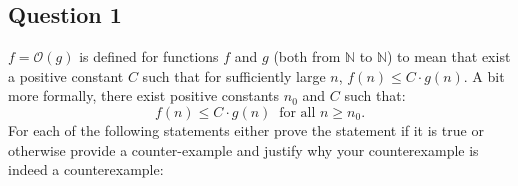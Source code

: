 \def\lc{\left\lceil}   
\def\rc{\right\rceil}
\runningheadrule
\firstpageheadrule
\cfoot{}
\subsection*{Question 1}
$f=\mathcal{O}(g)$ is defined for functions $f$ and $g$ (both from $\mathbb{N}$ to $\mathbb{N}$) to mean that exist a positive constant $C$ such that for sufficiently large $n$, $f(n)\leq C\cdot g(n)$. A bit more formally, there exist positive constants $n_0$ and $C$ such that:
$$f(n)\leq C\cdot g(n) \ \text{ for all } n\geq n_0.$$
For each of the following statements either prove the statement if it is true or otherwise provide a counter-example and justify why your counterexample is indeed a counterexample:
